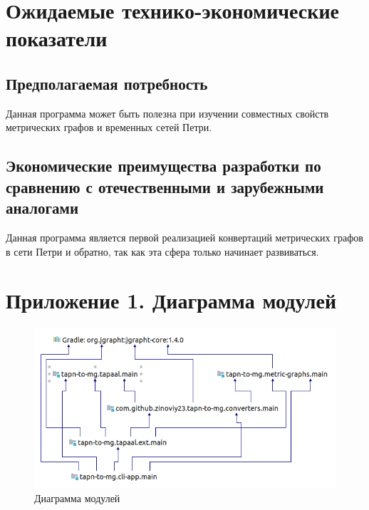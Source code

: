 \documentclass{../TechDoc}
\begin{document}
	 \section{Ожидаемые технико-экономические показатели}
	 \subsection{Предполагаемая потребность}
		 Данная программа может быть полезна при изучении совместных свойств метрических графов и временных сетей Петри. 
	 
	 \subsection{Экономические преимущества разработки по сравнению с отечественными и зарубежными аналогами}
		 Данная программа является первой реализацией конвертаций метрических графов в сети Петри и обратно, так как эта сфера только начинает развиваться.
		 
	\newpage
	\addtocounter{section}{2}
	
	\section*{Приложение 1. Диаграмма модулей}
	\begin{figure}[h!]
		\centering
		\includegraphics[width=0.9\linewidth]{modules_diagram}
		\caption{Диаграмма модулей}
		\label{fig:modulesdiagram}
	\end{figure}
	
	
\end{document}
